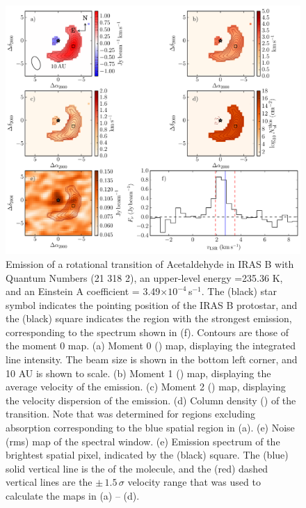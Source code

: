 \documentclass[iop,twocolappendix]{emulateapj}
\begin{document}
\begin{figure}[t]
\begin{center}
\includegraphics[width=15cm]{Acetaldehyde_(14-510-1).pdf}
\caption{Emission of a rotational transition of Acetaldehyde in IRAS B with Quantum Numbers (21 318 2), an upper-level energy {\Eul}=235.36 K, and an Einstein A coefficient {\Aul} = 3.49${\times}10^{-4}$\,s$^{-1}$. The (black) star symbol indicates the pointing position of the IRAS B protostar, and the (black) square indicates the region with the strongest emission, corresponding to the spectrum shown in (f). Contours are those of the moment 0 map. (a) Moment 0 (\momzero) map, displaying the integrated line intensity. The beam size is shown in the bottom left corner, and 10 AU is shown to scale. (b) Moment 1 (\momone) map, displaying the average velocity of the emission. (c) Moment 2 (\momtwo) map, displaying the velocity dispersion of the emission. (d) Column density (\Nthin) of the transition. Note that {\Nthin} was determined for regions excluding absorption corresponding to the blue spatial region in (a). (e) Noise (rms) map of the spectral window. (e) Emission spectrum of the brightest spatial pixel, indicated by the (black) square. The (blue) solid vertical line is the {\vLSR} of the molecule, and the (red) dashed vertical lines are the ${\pm}\,1.5\,\sigma$ velocity range that was used to calculate the maps in (a) -- (d).}
\label{fig:exmaps}
\end{center}
\end{figure}
\end{document}
